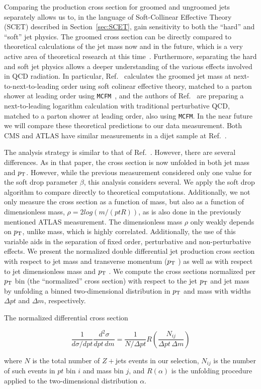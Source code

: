 Comparing the production cross section for groomed and ungroomed jets separately allows us to, in the language of Soft-Collinear Effective Theory (SCET) described in Section~\ref{sec:SCET},
gain sensitivity to both the ``hard'' and ``soft'' jet physics. 
The groomed cross section can be directly compared to theoretical calculations of the jet mass
now and in the future, which is a very active area of theoretical research
at this time~\cite{Dasgupta:2012hg,Chien:2012ur,Jouttenus:2013hs,Almeida:2014uva,Liu:2014oog,Stewart:2014nna,Khelifa-Kerfa:2015mma,Frye:2016aiz,Kolodrubetz:2016dzb}. Furthermore, separating the hard and soft jet physics
allows a deeper understanding of the various effects involved in QCD
radiation. In particular, Ref.~\cite{Frye:2016aiz} calculates the
groomed jet mass at next-to-next-to-leading order using soft colinear effective theory, matched to a
parton shower at leading order using {\tt MCFM}~\cite{MCFM1,MCFM2}, and the authors of Ref.~\cite{mmdt}  are preparing a next-to-leading logarithm calculation with traditional perturbative QCD, matched to a 
parton shower at leading order, also using {\tt MCFM}.  In the near future we will compare these theoretical predictions to our data measurement. Both CMS and ATLAS have similar measurements in a dijet sample at Ref.~\cite{cms_jetmassDijet, atlas_jetmass2}.

The analysis strategy is similar to that of Ref.~\cite{cms_jetmassDijet}.
However, there are several differences. As in that paper, the cross section is now
unfolded in both jet mass and $p_{\mathrm{T}}$. However, while the previous measurement
considered only one value for the soft drop parameter $\beta$, this analysis considers several.
We apply the soft drop algorithm to compare directly to theoretical computations. Additionally, we not only measure the cross section as a function of mass, but also as a function of dimensionless mass, $\rho = 2log(m/(pt R))$, as is also done in the previously mentioned ATLAS measurement.  The dimensionless mass $\rho$ only weakly depends on $p_{\mathrm{T}}$, unlike mass, which is highly correlated. Additionally, the use of this variable aids in the separation of fixed order, perturbative and non-perturbative effects.
We present the normalized double differential jet production cross section with respect to jet mass and transverse momentum ($p_{\mathrm{T}}$ ) as well as with respect to jet dimensionless mass and $p_{\mathrm{T}}$ . We compute the cross sections normalized per $p_{\mathrm{T}}$ bin
(the ``normalized'' cross section) with respect to the jet $p_{\mathrm{T}}$ and jet mass 
by unfolding a binned two-dimensional distribution in $p_{\mathrm{T}}$ and mass
with widths $\Delta pt$ and $\Delta m$, respectively.

The normalized differential cross section

\begin{equation}
\frac{1}{d\sigma/dpt}\frac{d^2\sigma}{dpt\,dm} = \frac{1}{N/\Delta pt} R(\frac{N_{ij}}{ \Delta pt \,\Delta m} )
\end{equation}

where $N$ is the total number of $Z+$jets events in our selection,
$N_{ij}$ is the number of such events in $pt$ bin $i$ and mass bin $j$,
and $R(\alpha)$ is the unfolding procedure applied to the two-dimensional
distribution $\alpha$.
